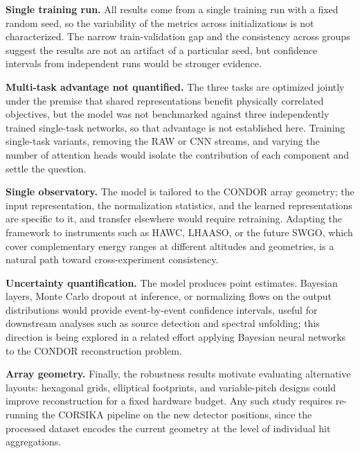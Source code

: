 \textbf{Single training run.} All results come from a single training run with a fixed random seed, so the variability of the metrics across initializations is not characterized. The narrow train-validation gap and the consistency across groups suggest the results are not an artifact of a particular seed, but confidence intervals from independent runs would be stronger evidence.

\textbf{Multi-task advantage not quantified.} The three tasks are optimized jointly under the premise that shared representations benefit physically correlated objectives, but the model was not benchmarked against three independently trained single-task networks, so that advantage is not established here. Training single-task variants, removing the RAW or CNN streams, and varying the number of attention heads would isolate the contribution of each component and settle the question.

\textbf{Single observatory.} The model is tailored to the CONDOR array geometry; the input representation, the normalization statistics, and the learned representations are specific to it, and transfer elsewhere would require retraining. Adapting the framework to instruments such as HAWC, LHAASO, or the future SWGO, which cover complementary energy ranges at different altitudes and geometries, is a natural path toward cross-experiment consistency.

\textbf{Uncertainty quantification.} The model produces point estimates. Bayesian layers, Monte Carlo dropout at inference, or normalizing flows on the output distributions would provide event-by-event confidence intervals, useful for downstream analyses such as source detection and spectral unfolding; this direction is being explored in a related effort applying Bayesian neural networks to the CONDOR reconstruction problem.

\textbf{Array geometry.} Finally, the robustness results motivate evaluating alternative layouts: hexagonal grids, elliptical footprints, and variable-pitch designs could improve reconstruction for a fixed hardware budget. Any such study requires re-running the CORSIKA pipeline on the new detector positions, since the processed dataset encodes the current geometry at the level of individual hit aggregations.